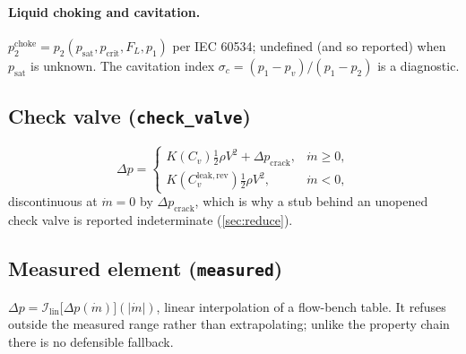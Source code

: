 \documentclass[11pt,a4paper]{article}
\newcommand{\mdot}{\dot{m}}
\newcommand{\code}[1]{\texttt{#1}}
\begin{document}
\paragraph{Liquid choking and cavitation.} $p_2^{\mathrm{choke}} = p_2(p_{\mathrm{sat}},p_{\mathrm{crit}},F_L,p_1)$
per IEC 60534; undefined (and so reported) when $p_{\mathrm{sat}}$ is unknown.
The cavitation index $\sigma_c=(p_1-p_v)/(p_1-p_2)$ is a diagnostic.

\subsection{Check valve (\code{check\_valve})}
\begin{equation}
  \Delta p = \begin{cases}
    K(C_v)\tfrac12\rho V^2 + \Delta p_{\mathrm{crack}}, & \mdot\ge0,\\
    K(C_v^{\mathrm{leak,rev}})\tfrac12\rho V^2, & \mdot<0,
  \end{cases}
\end{equation}
discontinuous at $\mdot=0$ by $\Delta p_{\mathrm{crack}}$, which is why a
stub behind an unopened check valve is reported indeterminate
(\cref{sec:reduce}).

\subsection{Measured element (\code{measured})}
$\Delta p = \mathcal{I}_{\mathrm{lin}}\bigl[\Delta p(\mdot)\bigr](|\mdot|)$,
linear interpolation of a flow-bench table. It refuses outside the measured
range rather than extrapolating; unlike the property chain there is no
defensible fallback.
\end{document}
